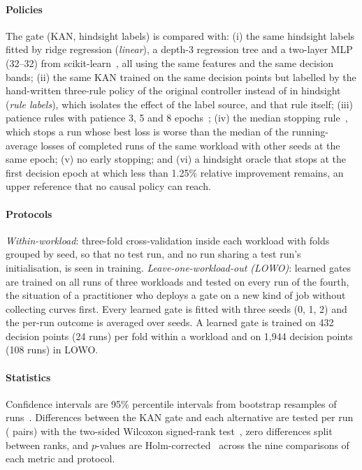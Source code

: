 \paragraph{Policies} The gate (KAN, hindsight labels) is compared with: (i) the same hindsight labels fitted by ridge regression (\emph{linear}), a depth-3 regression tree and a two-layer MLP (32--32) from scikit-learn~\cite{pedregosa2011sklearn}, all using the same features and the same decision bands; (ii) the same KAN trained on the same decision points but labelled by the hand-written three-rule policy of the original controller instead of in hindsight (\emph{rule labels}), which isolates the effect of the label source, and that rule itself; (iii) patience rules with patience 3, 5 and 8 epochs~\cite{prechelt2012early}; (iv) the median stopping rule~\cite{golovin2017vizier}, which stops a run whose best loss is worse than the median of the running-average losses of completed runs of the same workload with other seeds at the same epoch; (v) no early stopping; and (vi) a hindsight oracle that stops at the first decision epoch at which less than 1.25\% relative improvement remains, an upper reference that no causal policy can reach.

\paragraph{Protocols} \emph{Within-workload}: three-fold cross-validation inside each workload with folds grouped by seed, so that no test run, and no run sharing a test run's initialisation, is seen in training. \emph{Leave-one-workload-out (LOWO)}: learned gates are trained on all runs of three workloads and tested on every run of the fourth, the situation of a practitioner who deploys a gate on a new kind of job without collecting curves first. Every learned gate is fitted with three seeds (0, 1, 2) and the per-run outcome is averaged over seeds. A learned gate is trained on 432 decision points (24 runs) per fold within a workload and on 1{,}944 decision points (108 runs) in LOWO.

\paragraph{Statistics} Confidence intervals are 95\% percentile intervals from  bootstrap resamples of runs~\cite{efron1993bootstrap}. Differences between the KAN gate and each alternative are tested per run (\nRuns{} pairs) with the two-sided Wilcoxon signed-rank test~\cite{wilcoxon1945}, zero differences split between ranks, and $p$-values are Holm-corrected~\cite{holm1979} across the nine comparisons of each metric and protocol.
